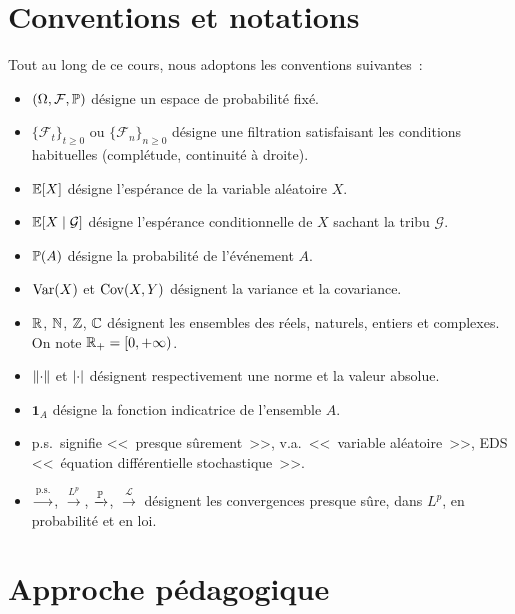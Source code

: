 \section*{Conventions et notations}

Tout au long de ce cours, nous adoptons les conventions suivantes~:

\begin{itemize}
  \item $(\Omega, \mathcal{F}, \mathbb{P})$ d\'esigne un espace de probabilit\'e fix\'e.
  \item $\{\mathcal{F}_t\}_{t \geq 0}$ ou $\{\mathcal{F}_n\}_{n \geq 0}$ d\'esigne
    une filtration satisfaisant les conditions habituelles (compl\'etude, continuit\'e \`a droite).
  \item $\mathbb{E}[X]$ d\'esigne l'esp\'erance de la variable al\'eatoire $X$.
  \item $\mathbb{E}[X \mid \mathcal{G}]$ d\'esigne l'esp\'erance conditionnelle de $X$ sachant
    la tribu $\mathcal{G}$.
  \item $\mathbb{P}(A)$ d\'esigne la probabilit\'e de l'\'ev\'enement $A$.
  \item $\mathrm{Var}(X)$ et $\mathrm{Cov}(X, Y)$ d\'esignent la variance et la covariance.
  \item $\mathbb{R}$, $\mathbb{N}$, $\mathbb{Z}$, $\mathbb{C}$ d\'esignent les ensembles des r\'eels, naturels,
    entiers et complexes. On note $\mathbb{R}_+ = [0, +\infty)$.
  \item $\left\| \cdot \right\|$ et $\left| \cdot \right|$ d\'esignent respectivement une norme et la
    valeur absolue.
  \item $\mathbf{1}_A$ d\'esigne la fonction indicatrice de l'ensemble $A$.
  \item p.s.\ signifie <<~presque s\^urement~>>, v.a.\ <<~variable al\'eatoire~>>,
    EDS <<~\'equation diff\'erentielle stochastique~>>.
  \item $\xrightarrow{\text{p.s.}}$, $\xrightarrow{L^p}$, $\xrightarrow{\mathbb{P}}$,
    $\xrightarrow{\mathcal{L}}$ d\'esignent les convergences presque s\^ure, dans $L^p$,
    en probabilit\'e et en loi.
\end{itemize}

\section*{Approche p\'edagogique}

